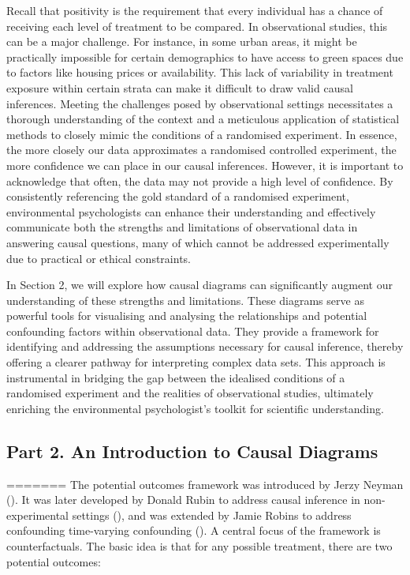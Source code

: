 \documentclass[
  singlecolumn]{article}
\begin{document}
Recall that positivity is the requirement that every individual has a
chance of receiving each level of treatment to be compared. In
observational studies, this can be a major challenge. For instance, in
some urban areas, it might be practically impossible for certain
demographics to have access to green spaces due to factors like housing
prices or availability. This lack of variability in treatment exposure
within certain strata can make it difficult to draw valid causal
inferences. Meeting the challenges posed by observational settings
necessitates a thorough understanding of the context and a meticulous
application of statistical methods to closely mimic the conditions of a
randomised experiment. In essence, the more closely our data
approximates a randomised controlled experiment, the more confidence we
can place in our causal inferences. However, it is important to
acknowledge that often, the data may not provide a high level of
confidence. By consistently referencing the gold standard of a
randomised experiment, environmental psychologists can enhance their
understanding and effectively communicate both the strengths and
limitations of observational data in answering causal questions, many of
which cannot be addressed experimentally due to practical or ethical
constraints.

In Section 2, we will explore how causal diagrams can significantly
augment our understanding of these strengths and limitations. These
diagrams serve as powerful tools for visualising and analysing the
relationships and potential confounding factors within observational
data. They provide a framework for identifying and addressing the
assumptions necessary for causal inference, thereby offering a clearer
pathway for interpreting complex data sets. This approach is
instrumental in bridging the gap between the idealised conditions of a
randomised experiment and the realities of observational studies,
ultimately enriching the environmental psychologist's toolkit for
scientific understanding.

\subsection{Part 2. An Introduction to Causal
Diagrams}\label{part-2.-an-introduction-to-causal-diagrams}
=======
The potential outcomes framework was introduced by Jerzy Neyman
(). It was later developed by
Donald Rubin to address causal inference in non-experimental settings
(), and was extended by Jamie Robins
to address confounding time-varying confounding
(). A central focus of the
framework is counterfactuals. The basic idea is that for any possible
treatment, there are two potential outcomes:
\end{document}

